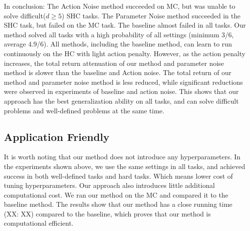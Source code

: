    In conclusion: The Action Noise method succeeded on MC, but was unable to solve difficult($d\ge5$) SHC tasks. The Parameter Noise method succeeded in the SHC task, but failed on the MC task. The baseline almost failed in all tasks. Our method solved all tasks with a high probability of all settings (minimum 3/6, average 4.9/6). All methods, including the baseline method, can learn to run continuously on the HC with light action penalty. However, as the action penalty increases, the total return attenuation of our method and parameter noise method is slower than the baseline and Action noise. The total return of our method and parameter noise method is less reduced, while significant reductions were observed in experiments of baseline and action noise. This shows that our approach has the best generalization ability on all tasks, and can solve difficult problems and well-defined problems at the same time.

   \subsection{Application Friendly}
   It is worth noting that our method does not introduce any hyperparameters. In the experiments shown above, we use the same settings in all tasks, and achieved success in both well-defined tasks and hard tasks. Which means lower cost of tuning hyperparameters.
   Our approach also introduces little additional computational cost. We ran our method on the MC and compared it to the baseline method. The results show that our method has a close running time (XX: XX) compared to the baseline, which proves that our method is computational efficient.